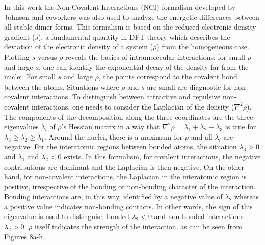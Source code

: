 		In this work the Non-Covalent Interactions (NCI) formalism developed by Johnson and coworkers\cite{johnson2010revealing} was also used to analyze the energetic differences between all stable dimer forms. This formalism is based on the reduced electronic density gradient ($s$), a fundamental quantity in DFT theory which describes the deviation of the electronic density of a system ($\rho$) from the homogeneous case. Plotting $s$ versus $\rho$ reveals the basics of intramolecular interactions: for small $\rho$ and large $s$, one can identify the exponential decay of the density far from the nuclei. For small $s$ and large $\rho$, the points correspond to the covalent bond between the atoms. Situations where $\rho$ and $s$ are small are diagnostic for non-covalent interactions. To distinguish between attractive and repulsive non-covalent interactions, one needs to consider the Laplacian of the density ($\nabla^{2} \rho$).\\
		
		The components of the decomposition along the three coordinates are the three eigenvalues $\lambda_{i}$ of $\rho$'s Hessian matrix in a way that $\nabla^{2} \rho = \lambda_{1} + \lambda_{2} + \lambda_{3}$ is true for $\lambda_{3} \geq \lambda_{2} \geq \lambda_1$. Around the nuclei, there is a maximum for $\rho$ and all $\lambda_i$ are negative. For the interatomic regions between bonded atoms, the situation $\lambda_{3} > 0$ and $\lambda_{1}$ and $\lambda_{2} < 0$ exists. In this formalism, for covalent interactions, the negative contributions are dominant and the Laplacian is then negative. On the other hand, for non-covalent interactions, the Laplacian in the interatomic region is positive, irrespective of the bonding or non-bonding character of the interaction. Bonding interactions are, in this way, identified by a negative value of $\lambda_{2}$ whereas a positive value indicates non-bonding contacts. In other words, the sign of this eigenvalue is used to distinguish bonded $\lambda_{2} < 0$ and non-bonded interactions $\lambda_{2} > 0$.  $\rho$ itself indicates the strength of the interaction, as can be seen from Figures 8a-h.\\
		
